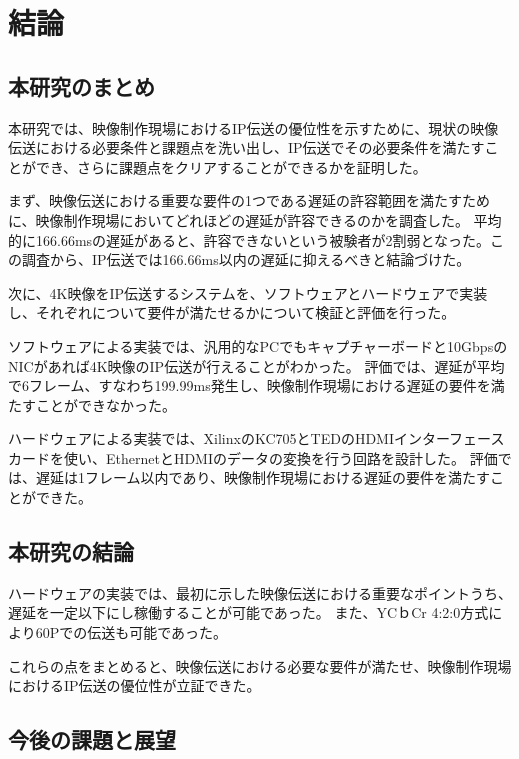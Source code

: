 \chapter{結論}
\label{chap:conclusion}

\section{本研究のまとめ}

本研究では、映像制作現場におけるIP伝送の優位性を示すために、現状の映像伝送における必要条件と課題点を洗い出し、IP伝送でその必要条件を満たすことができ、さらに課題点をクリアすることができるかを証明した。

まず、映像伝送における重要な要件の1つである遅延の許容範囲を満たすために、映像制作現場においてどれほどの遅延が許容できるのかを調査した。
平均的に166.66msの遅延があると、許容できないという被験者が2割弱となった。この調査から、IP伝送では166.66ms以内の遅延に抑えるべきと結論づけた。

次に、4K映像をIP伝送するシステムを、ソフトウェアとハードウェアで実装し、それぞれについて要件が満たせるかについて検証と評価を行った。

ソフトウェアによる実装では、汎用的なPCでもキャプチャーボードと10GbpsのNICがあれば4K映像のIP伝送が行えることがわかった。
評価では、遅延が平均で6フレーム、すなわち199.99ms発生し、映像制作現場における遅延の要件を満たすことができなかった。

ハードウェアによる実装では、XilinxのKC705とTEDのHDMIインターフェースカードを使い、EthernetとHDMIのデータの変換を行う回路を設計した。
評価では、遅延は1フレーム以内であり、映像制作現場における遅延の要件を満たすことができた。

\section{本研究の結論}

ハードウェアの実装では、最初に示した映像伝送における重要なポイントうち、遅延を一定以下にし稼働することが可能であった。
また、YCｂCr 4:2:0方式により60Pでの伝送も可能であった。

これらの点をまとめると、映像伝送における必要な要件が満たせ、映像制作現場におけるIP伝送の優位性が立証できた。

\section{今後の課題と展望}

